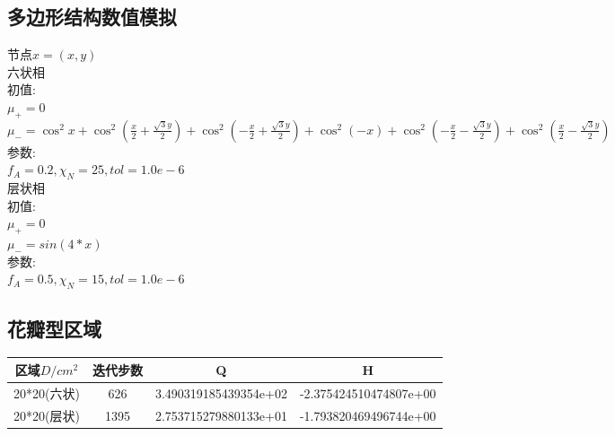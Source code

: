 \documentclass[12pt]{article}
\begin{document}
\begin{CJK}{UTF8}{gkai}
   \section{多边形结构数值模拟}


节点$x=(x,y)$\\

六状相\\

初值:\\

$ \mu_+=0 $\\

$ \mu_-=\cos^{2}x+\cos^2 (\frac{x}{2}+\frac{\sqrt{3}y}{2})+\cos^2(-\frac{x}{2}+\frac{\sqrt{3}y}{2})+\cos^{2}(-x)+\cos^2 (-\frac{x}{2}-\frac{\sqrt{3}y}{2})+\cos^2 (\frac{x}{2}-\frac{\sqrt{3}y}{2})$\\

参数:\\

$f_A=0.2,\chi_N=25,tol=1.0e-6$\\

层状相\\

初值:\\

$ \mu_+=0 $\\

$ \mu_-=sin(4*x)$\\

参数:\\

$f_A=0.5,\chi_N=15,tol=1.0e-6$\\ 

\subsection{花瓣型区域}   
\begin{table}[H]
	\centering
	\begin{tabular}{cccc}
		\toprule
		区域$D/cm^2$ &	迭代步数 & Q &  H \\
		\midrule
		20*20(六状)&626& 3.490319185439354e+02 & -2.375424510474807e+00\\
		20*20(层状)&1395 &2.753715279880133e+01 &-1.793820469496744e+00\\
		\bottomrule
	\end{tabular}
\end{table}


\end{CJK}
\end{document}
